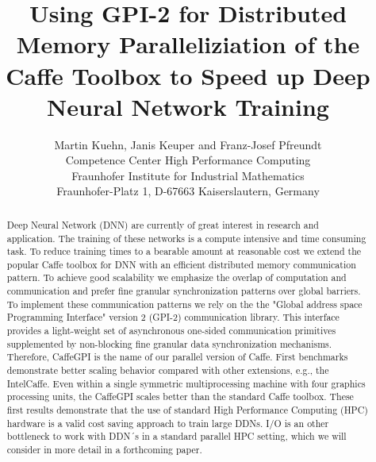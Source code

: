 \documentclass[twoside,twocolumn]{article}
\begin{document}
%
\title{\textbf{\Large Using GPI-2 for Distributed Memory Paralleliziation of the Caffe 
Toolbox to Speed up Deep Neural Network Training }\\[0.2ex]}

\author{\large Martin Kuehn, Janis Keuper and
Franz-Josef Pfreundt\\[0.3ex]
Competence Center High Performance Computing\\
Fraunhofer Institute for Industrial Mathematics\\
Fraunhofer-Platz 1, D-67663 Kaiserslautern, Germany}


\maketitle


\begin{abstract}
Deep Neural Network (DNN) are currently of great interest in research and application.
The training of these networks is a compute intensive and time consuming task.
To reduce training times to a bearable amount at reasonable cost
we extend the popular Caffe toolbox for DNN with an efficient distributed
memory communication pattern. To achieve good scalability we emphasize
the overlap of computation and communication and prefer fine granular
synchronization patterns over global barriers. To implement these
communication patterns we rely on the the "Global address space Programming Interface" version 2
(GPI-2) communication library.
This interface provides a light-weight set of asynchronous one-sided communication primitives
supplemented by non-blocking fine granular data synchronization mechanisms.
Therefore, CaffeGPI is the name of our parallel version of Caffe.
First benchmarks demonstrate better scaling behavior compared
with other extensions, e.g., the Intel\texttrademark Caffe. Even within a
single symmetric multiprocessing machine with four graphics processing units,
the CaffeGPI scales better than
the standard Caffe toolbox.
These first results demonstrate that the use of standard
High Performance Computing (HPC) hardware
is a valid cost saving approach
to train large DDNs. I/O is an other bottleneck to work with DDN´s in
a standard parallel HPC setting, which we will consider in more detail in a
forthcoming paper.

\end{abstract}
\end{document}

